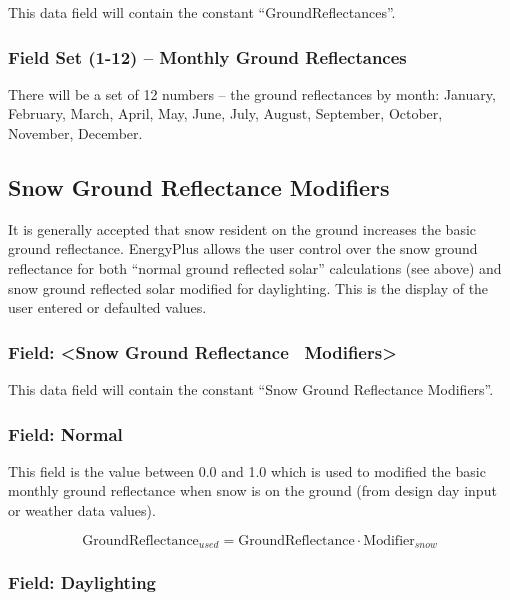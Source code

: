 This data field will contain the constant ``GroundReflectances''.

\subsubsection{Field Set (1-12) -- Monthly Ground Reflectances}\label{field-set-1-12-monthly-ground-reflectances}

There will be a set of 12 numbers -- the ground reflectances by month: January, February, March, April, May, June, July, August, September, October, November, December.

\subsection{Snow Ground Reflectance Modifiers}\label{snow-ground-reflectance-modifiers}

It is generally accepted that snow resident on the ground increases the basic ground reflectance. EnergyPlus allows the user control over the snow ground reflectance for both ``normal ground reflected solar'' calculations (see above) and snow ground reflected solar modified for daylighting. This is the display of the user entered or defaulted values.

\subsubsection{Field: \textless{}Snow Ground Reflectance~ Modifiers\textgreater{}}\label{field-snow-ground-reflectance-modifiers}

This data field will contain the constant ``Snow Ground Reflectance Modifiers''.

\subsubsection{Field: Normal}\label{field-normal}

This field is the value between 0.0 and 1.0 which is used to modified the basic monthly ground reflectance when snow is on the ground (from design day input or weather data values).

\begin{equation}
\text{GroundReflectance}_{used} = \text{GroundReflectance} \cdot \text{Modifier}_{snow}
\end{equation}

\subsubsection{Field: Daylighting}\label{field-daylighting}

